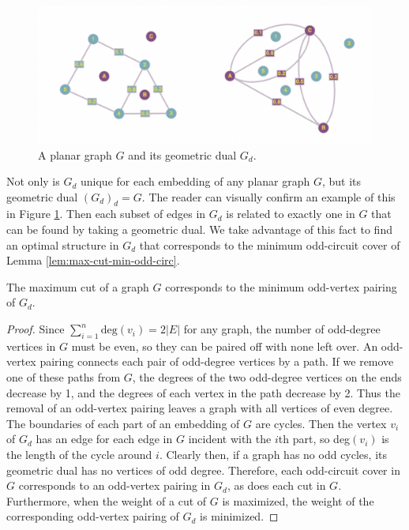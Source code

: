 \begin{figure}[h]
    \centering
    \includegraphics[scale=.35]{geom_dual.png}
    \caption{A planar graph $G$ and its geometric dual $G_d$.}
    \label{fig:geom_dual}
\end{figure}

\par Not only is $G_d$ unique for each embedding of any planar graph $G$, but its geometric dual $(G_d)_d = G$.\cite{hadlock} The reader can visually confirm an example of this in Figure \ref{fig:geom_dual}. Then each subset of edges in $G_d$ is related to exactly one in $G$ that can be found by taking a geometric dual. We take advantage of this fact to find an optimal structure in $G_d$ that corresponds to the minimum odd-circuit cover of Lemma \ref{lem:max-cut-min-odd-circ}.

\newpage

\begin{theorem}
    The maximum cut of a graph $G$ corresponds to the minimum odd-vertex pairing of $G_d$.\cite{Hadlock}
\end{theorem}

\begin{proof}
    Since $\sum_{i=1}^{n} \text{deg}(v_i) = 2|E|$ for any graph, the number of odd-degree vertices in $G$ must be even, so they can be paired off with none left over. An odd-vertex pairing connects each pair of odd-degree vertices by a path. If we remove one of these paths from $G$, the degrees of the two odd-degree vertices on the ends decrease by 1, and the degrees of each vertex in the path decrease by 2. Thus the removal of an odd-vertex pairing leaves a graph with all vertices of even degree. \\
    
    The boundaries of each part of an embedding of $G$ are cycles. Then the vertex $v_i$ of $G_d$ has an edge for each edge in $G$ incident with the $i$th part, so deg$(v_i)$ is the length of the cycle around $i$. Clearly then, if a graph has no odd cycles, its geometric dual has no vertices of odd degree. Therefore, each odd-circuit cover in $G$ corresponds to an odd-vertex pairing in $G_d$, as does each cut in $G$. \\
    
    Furthermore, when the weight of a cut of $G$ is maximized, the weight of the corresponding odd-vertex pairing of $G_d$ is minimized.
\end{proof}

